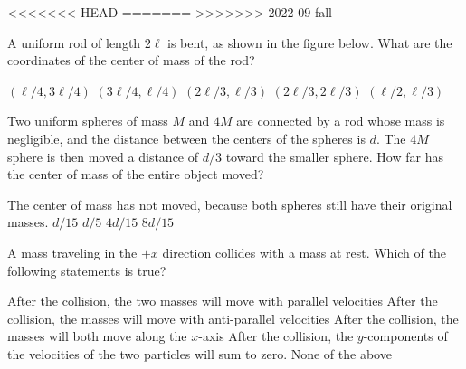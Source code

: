 \documentclass{../../oss-apphys-exam}
\begin{document}
\genheader

<<<<<<< HEAD
=======
>>>>>>> 2022-09-fall

\genmultidirections

\gengravity

\raggedcolumns
\begin{multicols*}{2}
  \begin{questions}
    \question A uniform rod of length $2\ell$ is bent, as shown in the figure
    below. What are the coordinates of the center of mass of the rod?
    \begin{center}
    \end{center}
    \begin{choices}
      \choice $(\ell/4,3\ell/4)$
      \correctchoice $(3\ell/4,\ell/4)$
      \choice $(2\ell/3,\ell/3)$
      \choice $(2\ell/3,2\ell/3)$
      \choice $(\ell/2,\ell/3)$
    \end{choices}

    \question Two uniform spheres of mass $M$ and $4M$ are connected by a rod
    whose mass is negligible, and the distance between the centers of the
    spheres is $d$. The $4M$ sphere is then moved a distance of $d/3$ toward the
    smaller sphere. How far has the center of mass of the entire object moved?
    \begin{choices}
      \choice The center of mass has not moved, because both spheres still have
      their original masses.
      \choice $d/15$
      \choice $d/5$
      \correctchoice $4d/15$
      \choice $8d/15$
    \end{choices}

    \question A mass traveling in the $+x$ direction collides with a mass at
    rest. Which of the following statements is true?
    \begin{choices}
      \choice After the collision, the two masses will move with parallel
      velocities
      \choice After the collision, the masses will move with anti-parallel
      velocities
      \choice After the collision, the masses will both move along the $x$-axis
      \choice After the collision, the $y$-components of the velocities of the
      two particles will sum to zero.
      \choice None of the above
    \end{choices}
    \columnbreak
    

\end{questions}
\end{multicols*}
\end{document}
